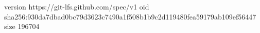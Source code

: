 version https://git-lfs.github.com/spec/v1
oid sha256:930da7dbad0bc79d3623c7490a1f508b1b9c2d119480fea59179ab109ef56447
size 196704
